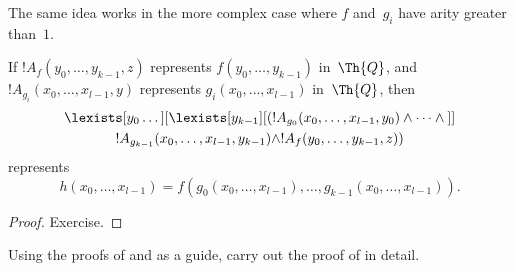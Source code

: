 \documentclass[../../../include/open-logic-section]{subfiles}
\begin{document}
The same idea works in the more complex case where $f$ and~$g_i$ have
arity greater than~$1$.

\begin{prop}
If $!A_f(y_0, \dots, y_{k-1}, z)$ represents $f(y_0, \dots, y_{k-1})$
in~$\Th{Q}$, and $!A_{g_i}(x_0, \dots, x_{l-1}, y)$ represents
$g_i(x_0, \dots, x_{l-1})$ in~$\Th{Q}$, then
\begin{multline*}
  \lexists[y_0\dots][\lexists[y_{k-1}][(!A_{g_0}(x_0,\dots,x_{l-1},y_0) \land
      \dots \land {}]]\\
  !A_{g_{k-1}}(x_0,\dots,x_{l-1},y_{k-1}) \land !A_f(y_0,\dots,y_{k-1},z))
\end{multline*}
represents
\[
h(x_0, \dots, x_{l-1}) = f(g_0(x_0, \dots, x_{l-1}), \dots, g_{k-1}(x_0,
\dots, x_{l-1})).
\]
\end{prop}

\begin{proof}
Exercise.
\end{proof}

\begin{prob}
Using the proofs of  and
 as a guide, carry out the proof of
 in detail.
\end{prob}
\end{document}
